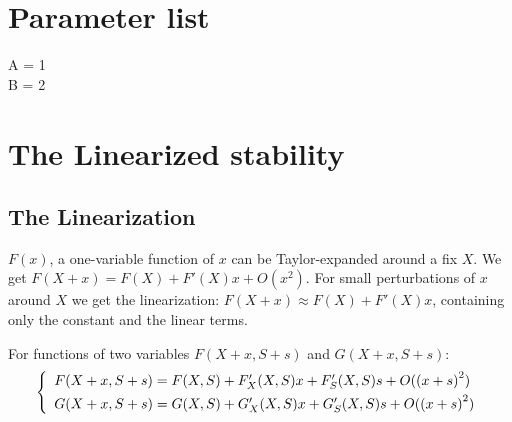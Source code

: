 \documentclass[a4paper, 10pt, twoside, openright]{book}
\begin{document}
\chapter{Parameter list} \label{parameters}
A = 1 \\
B = 2





\chapter{The Linearized stability} \label{Stab}

\section{The Linearization}

$F(x)$, a one-variable function of $x$ can be Taylor-expanded
around a fix $X$. We get $F(X+x)=F(X) + F'(X) x + O({x}^{2})$.
For small perturbations of $x$ around $X$ we get the linearization:
$F(X+x) \approx F(X) + F'(X) x$, containing only the
constant and the linear terms.

For functions of two variables $F(X+x,S+s)$ and $G(X+x,S+s)$:
\begin{displaymath} 
\left\{ \begin{array}{l}
F(X+x,S+s)= F(X,S) + {F}_{X}'(X,S)x + {F}_{S}'(X,S)s + O({(x+s)}^{2})\\
G(X+x,S+s)= G(X,S) + {G}_{X}'(X,S)x + {G}_{S}'(X,S)s + O({(x+s)}^{2})
\rule{0pt}{3ex} 
\end{array}\right. 
\end{displaymath}
\end{document}
